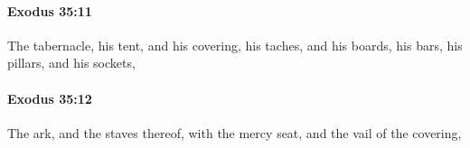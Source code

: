 		\paragraph{Exodus 35:11} %
			\label{EXODUS-35-11}

			The tabernacle, his tent, and his covering, his taches, and his boards, his bars, his pillars, and his sockets,


		\paragraph{Exodus 35:12} %
			\label{EXODUS-35-12}

			The ark, and the staves thereof, with the mercy seat, and the vail of the covering,


